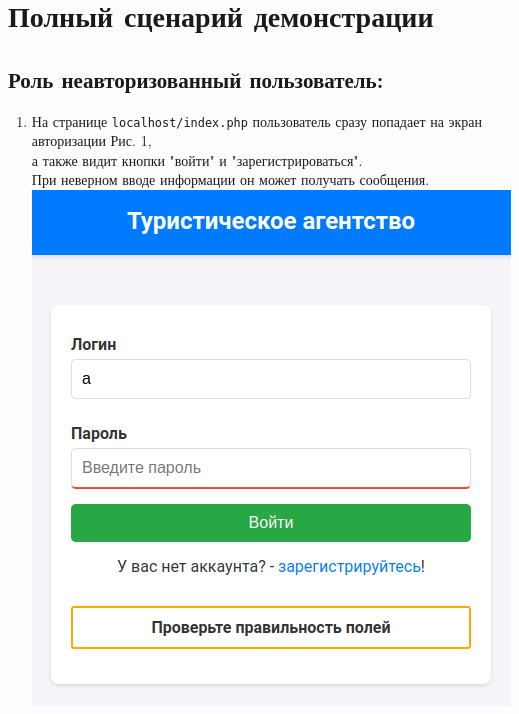 \documentclass[a4paper,12pt]{article}
\begin{document}
\section{Полный сценарий демонстрации}

\subsection{Роль неавторизованный пользователь:}
\begin{enumerate}
    \item На странице \texttt{localhost/index.php} пользователь сразу попадает на экран авторизации Рис. 1, \\
          а также видит кнопки "войти" и "зарегистрироваться". \\
          При неверном вводе информации он может получать сообщения. \\
          \includegraphics[scale=0.5]{media/unregistered/login_check.png} \\

\end{enumerate}
\end{document}

